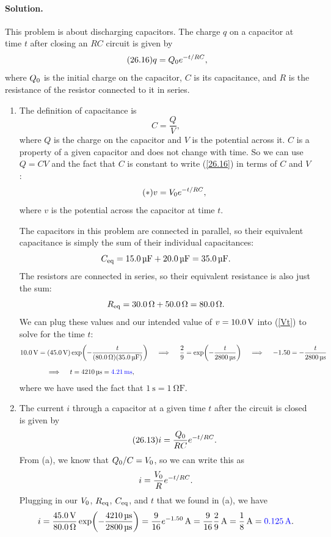 \documentclass[11pt]{article}
\newcommand{\refeq}[1]{(\ref{#1})}
\newcommand{\beq}{\begin{equation*}}
\newcommand{\eeq}{\end{equation*}}
\newcommand{\beqn}{\begin{equation}}
\newcommand{\eeqn}{\end{equation}}
\newenvironment{solution}
{
    \paragraph{Solution.}
    \ignorespaces
}
{
    \bigskip
}
\begin{document}
\begin{solution}
	This problem is about discharging capacitors.  The charge $q$ on a capacitor at time $t$ after closing an $RC$ circuit is given by
	\beqn \label{26.16} \tag{26.16}
		q = \Qo e^{-t / RC},
	\eeqn
	where $Q_0$ is the initial charge on the capacitor, $C$ is its capacitance, and $R$ is the resistance of the resistor connected to it in series.
	
	\begin{enumerate}
		\item The definition of capacitance is
		\beq
			C = \frac{Q}{V},
		\eeq
		where $Q$ is the charge on the capacitor and $V$ is the potential across it.  $C$ is a property of a given capacitor and does not change with time.  So we can use $Q = C V$ and the fact that $C$ is constant to write \refeq{26.16} in terms of $C$ and $V$:
		\beqn \tag{$*$} \label{Vt}
			v = \Vo e^{-t / RC},
		\eeqn
		where $v$ is the potential across the capacitor at time $t$.
		
		The capacitors in this problem are connected in parallel, so their equivalent capacitance is simply the sum of their individual capacitances:
		\beq
			\Ceq = \SI{15.0}{\micro\farad} + \SI{20.0}{\micro\farad}
			= \SI{35.0}{\micro\farad}.
		\eeq
		The resistors are connected in series, so their equivalent resistance is also just the sum:
		\beq
			\Req = \SI{30.0}{\ohm} + \SI{50.0}{\ohm}
			= \SI{80.0}{\ohm}.
		\eeq
		We can plug these values and our intended value of $v = \SI{10.0}{\volt}$ into \refeq{Vt} to solve for the time $t$:
		\begin{align*}
			\SI{10.0}{\volt} &= (\SI{45.0}{\volt}) \exp(-\frac{t}{(\SI{80.0}{\ohm}) (\SI{35.0}{\micro\farad})})
			\quad\implies\quad
			\frac{2}{9} = \exp(-\frac{t}{\SI{2800}{\micro\second}})
			\quad\implies\quad
			-1.50 = -\frac{t}{\SI{2800}{\micro\second}} \\[1.5ex]
			&\quad\implies\quad
			t = \SI{4210}{\micro\second}
			= {\color{blue} \SI{4.21}{\milli\second}},
		\end{align*}
		where we have used the fact that $\SI{1}{\second} = \SI{1}{\ohm\farad}$.
		
		\vfill
		
		\item The current $i$ through a capacitor at a given time $t$ after the circuit is closed is given by
		\beq \tag{26.13}
			i = \frac{\Qo}{RC} e^{-t / RC}.
		\eeq
		From (a), we know that $Q_0 / C = V_0$, so we can write this as
		\beq
			i = \frac{\Vo}{R} e^{-t / RC}.
		\eeq
		Plugging in our $V_0$, $R_\text{eq}$, $C_\text{eq}$, and $t$ that we found in (a), we have
		\beq
			i = \frac{\Svolt{45.0}}{\SI{80.0}{\ohm}} \exp(-\frac{\SI{4210}{\micro\second}}{\SI{2800}{\micro\second}})
			= \frac{9}{16} e^{-1.50}\,\si{\ampere}
			= \frac{9}{16} \frac{2}{9}\,\si{\ampere}
			= \frac{1}{8}\,\si{\ampere}
			= {\color{blue} \SI{0.125}{\ampere}}.
		\eeq
	\end{enumerate}
	\vspace{-\baselineskip}
\end{solution}
\end{document}
